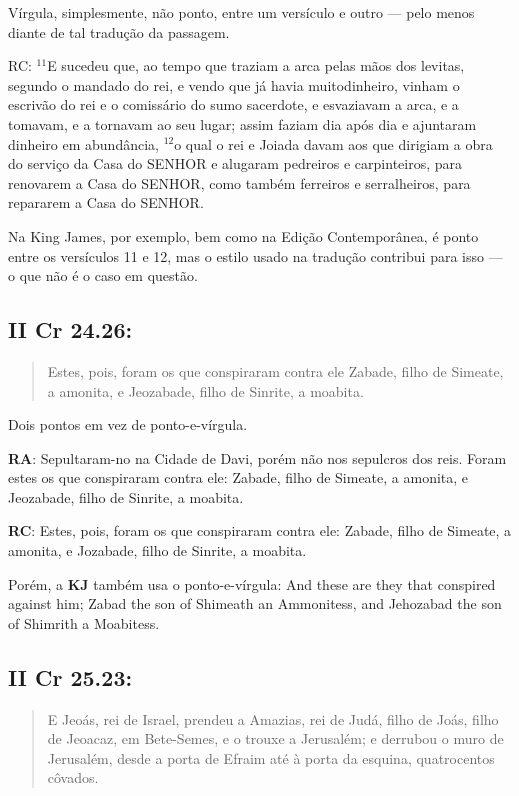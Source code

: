 Vírgula, simplesmente, não ponto, entre um versículo e outro --- pelo menos diante de tal tradução da passagem.

RC: $^{\mathrm{11}}$E sucedeu que, ao tempo que traziam a arca pelas mãos dos levitas, segundo o mandado do rei, e vendo que já havia muitodinheiro, vinham o escrivão do rei e o comissário do sumo sacerdote, e esvaziavam a arca, e a tomavam, e a tornavam ao seu lugar; assim faziam dia após dia e ajuntaram dinheiro em abundância, $^{\mathrm{12}}$o qual o rei e Joiada davam aos que dirigiam a obra do
serviço da Casa do SENHOR e alugaram pedreiros e carpinteiros, para renovarem a Casa do SENHOR, como também ferreiros e serralheiros, para repararem a Casa do SENHOR.

Na King James, por exemplo, bem como na Edição Contemporânea, é ponto
entre os versículos 11 e 12, mas o estilo usado na tradução contribui
para isso --- o que não é o caso em questão.


\subsection{II Cr 24.26:}
\begin{quote}
    \small
Estes, pois, foram os que conspiraram contra ele\uwave{;} Zabade, filho de Simeate, a amonita, e Jeozabade, filho de Sinrite, a moabita.
\end{quote}
 
Dois pontos em vez de ponto-e-vírgula.

\textbf{RA}: Sepultaram-no na Cidade de Davi, porém não nos sepulcros dos reis. Foram estes os que conspiraram contra ele: Zabade, filho de Simeate, a amonita, e Jeozabade, filho de Sinrite, a moabita.

\textbf{RC}: Estes, pois, foram os que conspiraram contra ele: Zabade, filho de Simeate, a amonita, e Jozabade, filho de Sinrite, a moabita.

Porém, a \textbf{KJ} também usa o ponto-e-vírgula: And these are they that conspired against him; Zabad the son of Shimeath an Ammonitess, and Jehozabad the son of Shimrith a Moabitess. 

\subsection{II Cr 25.23:}
\begin{quote}
    \small
E Jeoás, rei de Israel, prendeu a Amazias, rei de Judá, filho de Joás,  filho de Jeoacaz, em Bete-Semes, e o trouxe a Jerusalém; e derrubou o muro de Jerusalém, desde a porta de Efraim até à porta da esquina, quatrocentos côvados.
\end{quote}
 
